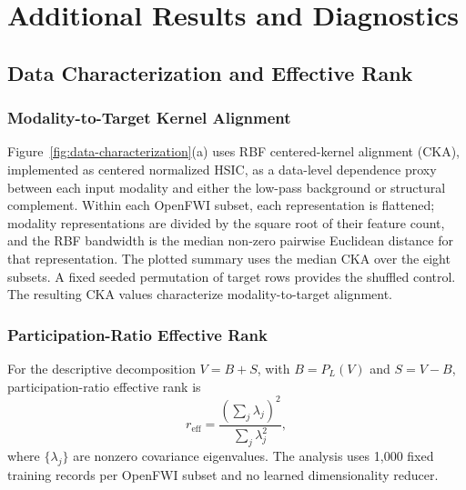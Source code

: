 \section{Additional Results and Diagnostics}
\label{app:additional}
\setcounter{equation}{0}
\setcounter{table}{0}
\setcounter{figure}{0}

\subsection{Data Characterization and Effective Rank}

\subsubsection{Modality-to-Target Kernel Alignment}

Figure~\ref{fig:data-characterization}(a) uses RBF centered-kernel alignment (CKA), implemented as centered normalized HSIC, as a data-level dependence proxy between each input modality and either the low-pass background or structural complement. Within each OpenFWI subset, each representation is flattened; modality representations are divided by the square root of their feature count, and the RBF bandwidth is the median non-zero pairwise Euclidean distance for that representation. The plotted summary uses the median CKA over the eight subsets. A fixed seeded permutation of target rows provides the shuffled control. The resulting CKA values characterize modality-to-target alignment.

\subsubsection{Participation-Ratio Effective Rank}

For the descriptive decomposition $V=B+S$, with $B=P_L(V)$ and $S=V-B$, participation-ratio effective rank is
\begin{equation}
r_{\mathrm{eff}}=
\frac{\left(\sum_j\lambda_j\right)^2}{\sum_j\lambda_j^2},
\end{equation}
where $\{\lambda_j\}$ are nonzero covariance eigenvalues. The analysis uses 1,000 fixed training records per OpenFWI subset and no learned dimensionality reducer.

